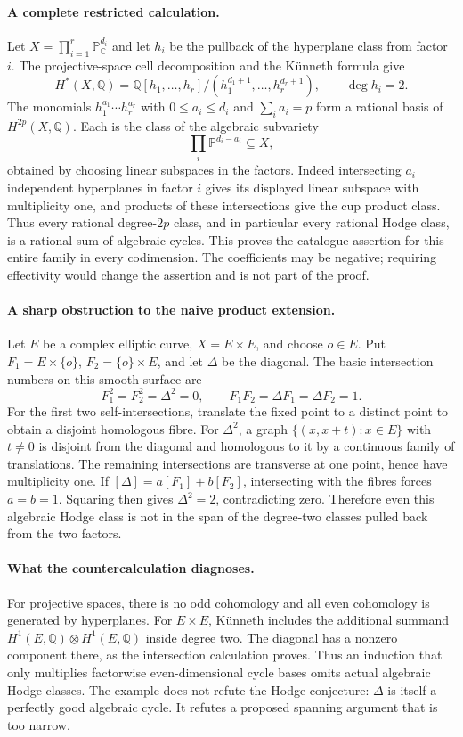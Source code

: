 \documentclass[11pt,a4paper]{article}
\begin{document}
\paragraph{A complete restricted calculation.}
Let $X=\prod_{i=1}^r\mathbb P^{d_i}_{\mathbb C}$ and let $h_i$ be the pullback
of the hyperplane class from factor $i$. The projective-space cell
decomposition and the K\"unneth formula give
\[
 H^*(X,\mathbb Q)=\mathbb Q[h_1,\ldots,h_r]/
                   (h_1^{d_1+1},\ldots,h_r^{d_r+1}),\qquad \deg h_i=2.
\]
The monomials $h_1^{a_1}\cdots h_r^{a_r}$ with $0\le a_i\le d_i$ and
$\sum_i a_i=p$ form a rational basis of $H^{2p}(X,\mathbb Q)$.
Each is the class of the algebraic subvariety
\[
                  \prod_i\mathbb P^{d_i-a_i}\subseteq X,
\]
obtained by choosing linear subspaces in the factors. Indeed intersecting
$a_i$ independent hyperplanes in factor $i$ gives its displayed linear
subspace with multiplicity one, and products of these intersections give
the cup product class. Thus every rational degree-$2p$ class, and in
particular every rational Hodge class, is a rational sum of algebraic cycles.
This proves the catalogue assertion for this entire family in every
codimension. The coefficients may be negative; requiring effectivity would
change the assertion and is not part of the proof.

\paragraph{A sharp obstruction to the naive product extension.}
Let $E$ be a complex elliptic curve, $X=E\times E$, and choose $o\in E$.
Put $F_1=E\times\{o\}$, $F_2=\{o\}\times E$, and let $\Delta$ be the diagonal.
The basic intersection numbers on this smooth surface are
\[
 F_1^2=F_2^2=\Delta^2=0,\qquad F_1F_2=\Delta F_1=\Delta F_2=1.
\]
For the first two self-intersections, translate the fixed point to a distinct
point to obtain a disjoint homologous fibre. For $\Delta^2$, a graph
$\{(x,x+t):x\in E\}$ with $t\ne0$ is disjoint from the diagonal and homologous
to it by a continuous family of translations. The remaining intersections
are transverse at one point, hence have multiplicity one.
If $[\Delta]=a[F_1]+b[F_2]$, intersecting with the fibres forces $a=b=1$.
Squaring then gives $\Delta^2=2$, contradicting zero. Therefore even this
algebraic Hodge class is not in the span of the degree-two classes pulled
back from the two factors.

\paragraph{What the countercalculation diagnoses.}
For projective spaces, there is no odd cohomology and all even cohomology is
generated by hyperplanes. For $E\times E$, K\"unneth includes the additional
summand $H^1(E,\mathbb Q)\otimes H^1(E,\mathbb Q)$ inside degree two.
The diagonal has a nonzero component there, as the intersection calculation
proves. Thus an induction that only multiplies factorwise even-dimensional
cycle bases omits actual algebraic Hodge classes. The example does not
refute the Hodge conjecture: $\Delta$ is itself a perfectly good algebraic
cycle. It refutes a proposed spanning argument that is too narrow.
\end{document}
